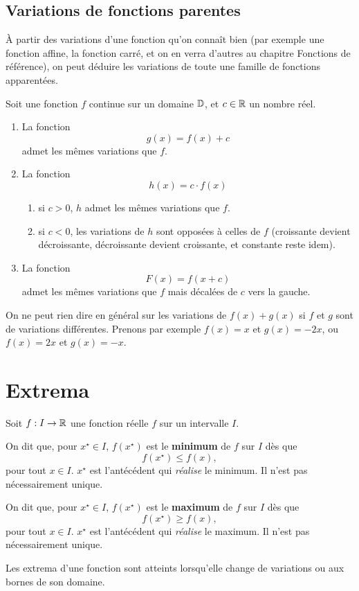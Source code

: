 \documentclass[a4paper, 12pt]{report}
\begin{document}
\subsection{Variations de fonctions parentes}

À partir des variations d'une fonction qu'on connaît bien (par exemple une fonction affine, la fonction carré, et on en verra d'autres au chapitre Fonctions de référence), on peut déduire les variations de toute une famille de fonctions apparentées.

\begin{thm}
	Soit une fonction $f$ continue sur un domaine $\mathbb{D}$, et $c\in\mathbb{R}$ un nombre réel.
		\begin{enumerate}
			\item La fonction
				\[ g(x) = f(x) + c \]
			admet les mêmes variations que $f$.
			\item La fonction
				\[ h(x) = c \cdot f(x) \]
				\begin{enumerate}[label=(\roman*)]
					\item si $c>0$, $h$ admet les mêmes variations que $f$.
					\item si $c<0$, les variations de $h$ sont opposées à celles de $f$ (croissante devient décroissante, décroissante devient croissante, et constante reste idem).
				\end{enumerate}

			\item La fonction
				\[ F(x) = f(x+c) \]
			admet les mêmes variations que $f$ mais décalées de $c$ vers la gauche.
		\end{enumerate}
\end{thm}

\begin{rmq}
On ne peut rien dire en général sur les variations de $f(x)+g(x)$ si $f$ et $g$ sont de variations différentes.
Prenons par exemple $f(x) = x$ et $g(x) = -2x$, ou $f(x) = 2x$ et $g(x) = -x$.
\end{rmq}

\section{Extrema}

\begin{defn}
	Soit $f : I \rightarrow \mathbb{R}$ une fonction réelle $f$ sur un intervalle $I$.
	
	On dit que, pour $x^\star \in I$, $f(x^\star)$ est le \textbf{minimum} de $f$ sur $I$ dès que
		\[ f(x^\star) \leq f(x), \]
	pour tout $x\in I$.
	$x^\star$ est l'antécédent qui \emph{réalise} le minimum. Il n'est pas nécessairement unique.
	
	On dit que, pour $x^\star \in I$, $f(x^\star)$ est le \textbf{maximum} de $f$ sur $I$ dès que
		\[ f(x^\star) \geq f(x), \]
	pour tout $x\in I$.
	$x^\star$ est l'antécédent qui \emph{réalise} le maximum. Il n'est pas nécessairement unique.
\end{defn}

\begin{prop}
Les extrema d'une fonction sont atteints lorsqu'elle change de variations ou aux bornes de son domaine.
\end{prop}
\end{document}

